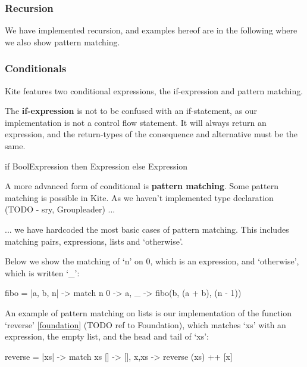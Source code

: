 \subsubsection{Recursion}

We have implemented recursion, and examples hereof are in the following where we also show pattern matching.


\subsubsection{Conditionals}

Kite features two conditional expressions, the if-expression and pattern matching.



The \textbf{if-expression} is not to be confused with an if-statement, as our implementation is not a control flow statement. It will always return an expression, and the return-types of the consequence and alternative must be the same.


\begin{kite}
  
  if BoolExpression then Expression else Expression
\end{kite}


A more advanced form of conditional is \textbf{pattern matching}. Some pattern matching is possible in Kite. As we haven't implemented type declaration (TODO - sry, Groupleader) ...

... we have hardcoded the most basic cases of pattern matching. This includes matching pairs, expressions, lists and `otherwise'.


Below we show the matching of `n' on 0, which is an expression, and `otherwise', which is written `\_':
\begin{kite}

fibo = |a, b, n| -> {
    match n {
    0 -> a,
    _ -> fibo(b, (a + b), (n - 1))
    }
}
\end{kite}

An example of pattern matching on lists is our implementation of the function `reverse' \ref{foundation} (TODO ref to Foundation), which matches `xs' with an expression, the empty list, and the head and tail of `xs':

\begin{kite}

reverse = |xs| -> {
  match xs {
    []    -> [],
    x,xs  -> reverse (xs) ++ [x]
  }
}

\end{kite}

